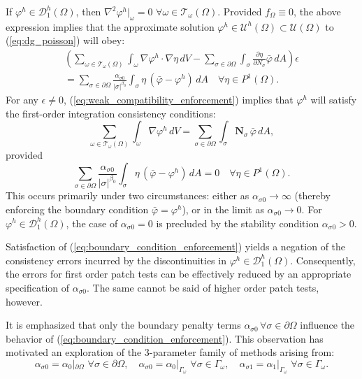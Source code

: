 	If $\varphi^h \in \mathcal{D}^h_1 (\Omega)$, then $\nabla^2 \varphi^h|_{\omega} = 0 \, \, \forall \omega \in \mathcal{T}_\omega (\Omega)$. Provided $f_{\Omega} \equiv 0$, the above expression implies that the approximate solution $\varphi^h \in \mathcal{U}^h (\Omega) \subset \mathcal{U} (\Omega)$ to (\ref{eq:dg_poisson}) will obey:
	\begin{eqnarray}
		\left( \sum_{\omega \in \mathcal{T}_\omega (\Omega)} \int_{\omega} \nabla \varphi^h \cdot \nabla \eta \, dV
		- \sum_{\sigma \in \partial \Omega} \int_{\sigma} \frac{\partial \eta}{\partial N_{\sigma}} \bar{\varphi} \, dA \right) \epsilon \nonumber \\ 
		= \sum_{\sigma \in \partial \Omega} \frac{\alpha_{\sigma0}}{|\sigma|^{\beta_0}} \int_{\sigma} \eta \, (\bar{\varphi} - \varphi^h) \, dA \quad \forall \eta \in P^1 (\Omega).
		\label{eq:weak_compatibility_enforcement}
	\end{eqnarray}
For any $\epsilon \neq 0$, (\ref{eq:weak_compatibility_enforcement}) implies that $\varphi^h$ will satisfy the first-order integration consistency conditions:
\begin{equation}
		\sum_{\omega \in \mathcal{T}_\omega (\Omega)} \int_{\omega} \nabla \varphi^h \, dV = \sum_{\sigma \in \partial \Omega} \int_{\sigma} \mathbf{N}_{\sigma} \, \bar{\varphi} \, dA,
\end{equation}
provided
\begin{equation}
		\sum_{\sigma \in \partial \Omega} \frac{\alpha_{\sigma0}}{|\sigma|^{\beta_0}} \int_{\sigma} \eta \, (\bar{\varphi} - \varphi^h) \, dA = 0 \quad \forall \eta \in P^1 (\Omega).
		\label{eq:boundary_condition_enforcement}
\end{equation}
This occurs primarily under two circumstances: either as $\alpha_{\sigma0} \rightarrow \infty$ (thereby enforcing the boundary condition $\bar{\varphi} = \varphi^h$), or in the limit as $\alpha_{\sigma0} \rightarrow 0$. For $\varphi^h \in \mathcal{D}^h_1 (\Omega)$, the case of $\alpha_{\sigma0} = 0$ is precluded by the stability condition $\alpha_{\sigma0} > 0$.

Satisfaction of (\ref{eq:boundary_condition_enforcement}) yields a negation of the consistency errors incurred by the discontinuities in $\varphi^h \in \mathcal{D}^h_1 (\Omega)$. Consequently, the errors for first order patch tests can be effectively reduced by an appropriate specification of $\alpha_{\sigma0}$. The same cannot be said of higher order patch tests, however.

It is emphasized that only the boundary penalty terms $\alpha_{\sigma0} \, \forall \sigma \in \partial \Omega$ influence the behavior of (\ref{eq:boundary_condition_enforcement}). This observation has motivated an exploration of the 3-parameter family of methods arising from:
	\begin{equation}
		\alpha_{\sigma 0} = \alpha_{0}|_{\partial \Omega} \, \, \forall \sigma \in \partial \Omega, \quad \alpha_{\sigma 0} = \alpha_{0}|_{\Gamma_{\omega}} \, \, \forall \sigma \in \Gamma_{\omega}, \quad \alpha_{\sigma 1} = \alpha_{1}|_{\Gamma_{\omega}} \, \, \forall \sigma \in \Gamma_{\omega}.
		\label{eq:penalty_parameters}
	\end{equation}
	
